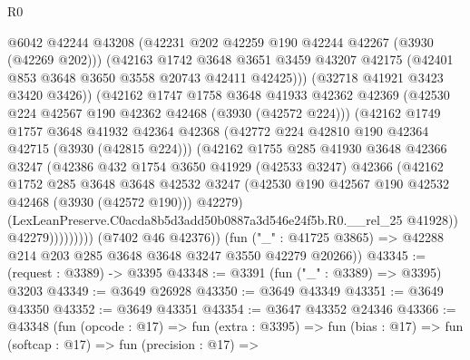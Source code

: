\begin{lexlean}{R0}
\begin{coremodule}
                        @6042
                        @42244
                        @43208
                        (@42231 @202 @42259 @190 @42244 @42267 (@3930 (@42269 @202)))
                        (@42163
                          @1742
                          @3648
                          @3651
                          @3459
                          @43207
                          @42175
                          (@42401 @853 @3648 @3650 @3558 @20743 @42411 @42425)))
                      (@32718 @41921 @3423 @3420 @3426))
                    (@42162
                      @1747
                      @1758
                      @3648
                      @41933
                      @42362
                      @42369
                      (@42530 @224 @42567 @190 @42362 @42468 (@3930 (@42572 @224)))
                      (@42162
                        @1749
                        @1757
                        @3648
                        @41932
                        @42364
                        @42368
                        (@42772 @224 @42810 @190 @42364 @42715 (@3930 (@42815 @224)))
                        (@42162
                          @1755
                          @285
                          @41930
                          @3648
                          @42366
                          @3247
                          (@42386
                            @432
                            @1754
                            @3650
                            @41929
                            (@42533 @3247)
                            @42366
                            (@42162
                              @1752
                              @285
                              @3648
                              @3648
                              @42532
                              @3247
                              (@42530 @190 @42567 @190 @42532 @42468 (@3930 (@42572 @190)))
                              @42279)
                            (LexLeanPreserve.C0acda8b5d3add50b0887a3d546e24f5b.R0.__rel_25 @41928))
                          @42279)))))))))
        (@7402 @46 @42376))
      (fun ("_" : @41725 @3865) => @42288 @214 @203 @285 @3648 @3648 @3247 @3550 @42279 @20266))
@43345 := (request : @3389) -> @3395
@43348 := @3391 (fun ("_" : @3389) => @3395) @3203
@43349 := @3649 @26928
@43350 := @3649 @43349
@43351 := @3649 @43350
@43352 := @3649 @43351
@43354 := @3647 @43352 @24346
@43366 := @43348
    (fun (opcode : @17) =>
    fun (extra : @3395) =>
    fun (bias : @17) =>
    fun (softcap : @17) =>
    fun (precision : @17) =>

\end{coremodule}
\end{lexlean}
